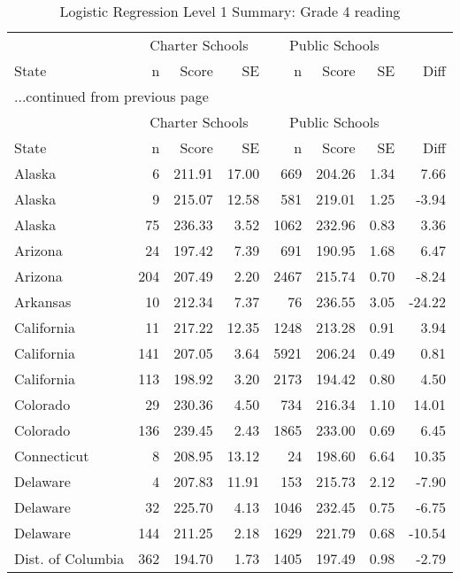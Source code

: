 \begin{longtable}{lrrr@{\extracolsep{10pt}}rrrr}
\caption{Logistic Regression Level 1 Summary: Grade 4 reading} \\ 
  \hline
  & \multicolumn{3}{c}{Charter Schools} & \multicolumn{3}{c}{Public Schools} & \\ \cline{2-4} \cline{5-7} State & n & Score & SE & n & Score & SE & Diff \\ \endfirsthead \multicolumn{8}{l}{{...continued from previous page}}\\ \hline & \multicolumn{3}{c}{Charter Schools} & \multicolumn{3}{c}{Public Schools} & \\ \cline{2-4} \cline{5-7} State & n & Score & SE & n & Score & SE & Diff \\ \hline \endhead \hline \endfoot \endlastfoot \hline
Alaska &   6 & 211.91 & 17.00 & 669 & 204.26 & 1.34 & 7.66 \\ 
  Alaska &   9 & 215.07 & 12.58 & 581 & 219.01 & 1.25 & -3.94 \\ 
  Alaska &  75 & 236.33 & 3.52 & 1062 & 232.96 & 0.83 & 3.36 \\ 
  Arizona &  24 & 197.42 & 7.39 & 691 & 190.95 & 1.68 & 6.47 \\ 
  Arizona & 204 & 207.49 & 2.20 & 2467 & 215.74 & 0.70 & -8.24 \\ 
  Arkansas &  10 & 212.34 & 7.37 &  76 & 236.55 & 3.05 & -24.22 \\ 
  California &  11 & 217.22 & 12.35 & 1248 & 213.28 & 0.91 & 3.94 \\ 
  California & 141 & 207.05 & 3.64 & 5921 & 206.24 & 0.49 & 0.81 \\ 
  California & 113 & 198.92 & 3.20 & 2173 & 194.42 & 0.80 & 4.50 \\ 
  Colorado &  29 & 230.36 & 4.50 & 734 & 216.34 & 1.10 & 14.01 \\ 
  Colorado & 136 & 239.45 & 2.43 & 1865 & 233.00 & 0.69 & 6.45 \\ 
  Connecticut &   8 & 208.95 & 13.12 &  24 & 198.60 & 6.64 & 10.35 \\ 
  Delaware &   4 & 207.83 & 11.91 & 153 & 215.73 & 2.12 & -7.90 \\ 
  Delaware &  32 & 225.70 & 4.13 & 1046 & 232.45 & 0.75 & -6.75 \\ 
  Delaware & 144 & 211.25 & 2.18 & 1629 & 221.79 & 0.68 & -10.54 \\ 
  Dist. of Columbia & 362 & 194.70 & 1.73 & 1405 & 197.49 & 0.98 & -2.79 \\ 

\end{longtable}
